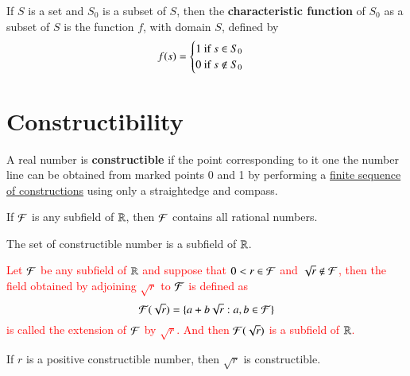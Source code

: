 \documentclass[11pt]{article}
\begin{document}
        \begin{definition}[10.3.31]
            If $S$ is a set and $S_0$ is a subset of $S$, then the \textbf{characteristic function} of $S_0$ as a subset of $S$ is the function $f$, with domain $S$, defined by
            \[
                f(s) = \begin{cases}
                    1 \text{{ if }} s \in S_0 \\
                    0 \text{{ if }} s \notin S_0
                \end{cases}
            \]
        \end{definition}
        
    \section{Constructibility}
        \begin{definition}[12.2.2]
            A real number is \textbf{constructible} if the point corresponding to it one the number line can be obtained from marked points 0 and 1 by performing a \ul{finite sequence of constructions} using only a straightedge and compass.
        \end{definition}
        
        \begin{theorem}[12.2.9]
            If $\mathcal{{F}}$ is any subfield of $\mathbb{R}$, then $\mathcal{{F}}$ contains all rational numbers.
        \end{theorem}
        
        \begin{theorem}[12.2.10]
            The set of constructible number is a subfield of $\mathbb{R}$.
        \end{theorem}
        
        \begin{theorem}[12.2.12\& 12.2.13]
            \textcolor{red}{Let $\mathcal{{F}}$ be any subfield of $\mathbb{R}$ and suppose that $0 < r \in \mathcal{{F}}$ and $\sqrt{r} \notin \mathcal{{F}}$, then the field obtained by adjoining $\sqrt{r}$ to $\mathcal{{F}}$ is defined as 
            \[
                \mathcal{{F}}(\sqrt{r}) = \{a + b \sqrt{r}: a, b \in \mathcal{{F}}\}
            \]
            is called the extension of $\mathcal{{F}}$ by $\sqrt{r}$. And then $\mathcal{{F}}(\sqrt{r})$ is a subfield of $\mathbb{R}$.
            }
        \end{theorem}
        
        \begin{theorem}[12.2.15]
            If $r$ is a positive constructible number, then $\sqrt{r}$ is constructible.
        \end{theorem}
        
\end{document}
